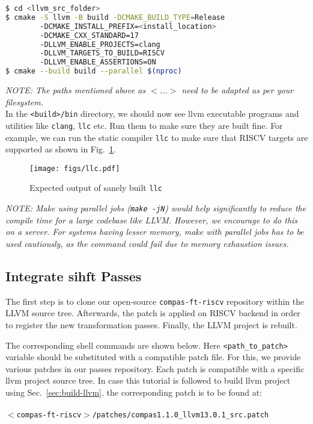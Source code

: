 \begin{framed}
 \begin{lstlisting}[language=bash, basicstyle=\small\ttfamily]
$ cd <llvm_src_folder>
$ cmake -S llvm -B build -DCMAKE_BUILD_TYPE=Release
        -DCMAKE_INSTALL_PREFIX=<install_location>
        -DCMAKE_CXX_STANDARD=17
        -DLLVM_ENABLE_PROJECTS=clang
        -DLLVM_TARGETS_TO_BUILD=RISCV
        -DLLVM_ENABLE_ASSERTIONS=ON
$ cmake --build build --parallel $(nproc)
  \end{lstlisting}
\end{framed}

\textit{NOTE: The paths mentioned above as $<$...$>$ need to be adapted as per your filesystem.} \\

In the \texttt{<build>/bin} directory, we should now see llvm executable programs and utilities like
\texttt{clang}, \texttt{llc} etc. Run them to make sure they are built fine. For example, we can run the
static compiler \texttt{llc} to make sure that RISCV targets are supported as shown in Fig.~\ref{fig:llc}. \\

\begin{figure}[htb]
 \centering
 \texttt{[image: figs/llc.pdf]}
 \caption{Expected output of sanely built \texttt{llc}}
 \label{fig:llc}
\end{figure}

\textit{NOTE: Make using parallel jobs (\texttt{make -jN}) would help significantly to reduce the compile time
 for a large codebase like LLVM. However, we encourage to do this on a server. For systems having lesser memory, make
 with parallel jobs has to be used cautiously, as the command could fail due to memory exhaustion issues.}

\subsection{Integrate \ac{sihft} Passes}
The first step is to clone our open-source \texttt{compas-ft-riscv} repository within the LLVM source tree. Afterwards,
the patch is applied on RISCV backend in order to register the new transformation passes. Finally, the LLVM project
is rebuilt.

The corresponding shell commands are shown below. Here \texttt{<path\_to\_patch>} variable should be substituted
with a compatible patch file. For this, we provide various patches in our passes repository.
Each patch is compatible with a specific llvm project source tree.
In case this tutorial is followed to build llvm project using Sec.~\ref{sec:build-llvm},
the corresponding patch is to be found at:\\\\
\texttt{$<$compas-ft-riscv$>$/patches/compas1.1.0\_llvm13.0.1\_src.patch}

